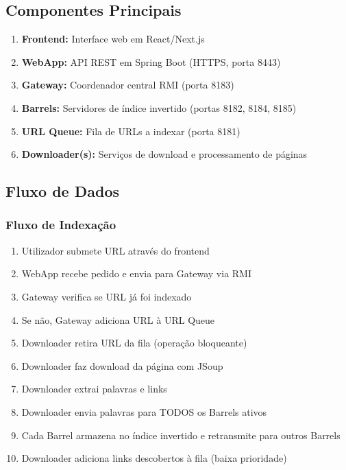 \documentclass[12pt,a4paper]{article}
\begin{document}
\subsection{Componentes Principais}

\begin{enumerate}
    \item \textbf{Frontend:} Interface web em React/Next.js
    \item \textbf{WebApp:} API REST em Spring Boot (HTTPS, porta 8443)
    \item \textbf{Gateway:} Coordenador central RMI (porta 8183)
    \item \textbf{Barrels:} Servidores de índice invertido (portas 8182, 8184, 8185)
    \item \textbf{URL Queue:} Fila de URLs a indexar (porta 8181)
    \item \textbf{Downloader(s):} Serviços de download e processamento de páginas
\end{enumerate}

\subsection{Fluxo de Dados}

\subsubsection{Fluxo de Indexação}
\begin{enumerate}
    \item Utilizador submete URL através do frontend
    \item WebApp recebe pedido e envia para Gateway via RMI
    \item Gateway verifica se URL já foi indexado
    \item Se não, Gateway adiciona URL à URL Queue
    \item Downloader retira URL da fila (operação bloqueante)
    \item Downloader faz download da página com JSoup
    \item Downloader extrai palavras e links
    \item Downloader envia palavras para TODOS os Barrels ativos
    \item Cada Barrel armazena no índice invertido e retransmite para outros Barrels
    \item Downloader adiciona links descobertos à fila (baixa prioridade)
\end{enumerate}
\end{document}
